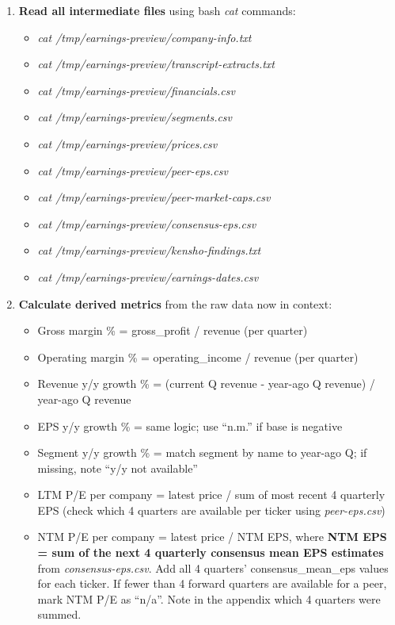 \documentclass[11pt]{article}
\begin{document}
\begin{enumerate}[leftmargin=*,itemsep=2pt,topsep=2pt]
\item {} \textbf{Read all intermediate files} using bash \emph{cat} commands:
\begin{itemize}[leftmargin=*,itemsep=2pt,topsep=2pt]
\item {} \emph{cat /tmp/earnings-preview/company-info.txt}
\item {} \emph{cat /tmp/earnings-preview/transcript-extracts.txt}
\item {} \emph{cat /tmp/earnings-preview/financials.csv}
\item {} \emph{cat /tmp/earnings-preview/segments.csv}
\item {} \emph{cat /tmp/earnings-preview/prices.csv}
\item {} \emph{cat /tmp/earnings-preview/peer-eps.csv}
\item {} \emph{cat /tmp/earnings-preview/peer-market-caps.csv}
\item {} \emph{cat /tmp/earnings-preview/consensus-eps.csv}
\item {} \emph{cat /tmp/earnings-preview/kensho-findings.txt}
\item {} \emph{cat /tmp/earnings-preview/earnings-dates.csv}
\end{itemize}
\item {} \textbf{Calculate derived metrics} from the raw data now in context:
\begin{itemize}[leftmargin=*,itemsep=2pt,topsep=2pt]
\item {} Gross margin \% = gross\_\allowbreak{}profit / revenue (per quarter)
\item {} Operating margin \% = operating\_\allowbreak{}income / revenue (per quarter)
\item {} Revenue y/y growth \% = (current Q revenue - year-ago Q revenue) / year-ago Q revenue
\item {} EPS y/y growth \% = same logic; use ``n.m.'' if base is negative
\item {} Segment y/y growth \% = match segment by name to year-ago Q; if missing, note ``y/y not available''
\item {} LTM P/E per company = latest price / sum of most recent 4 quarterly EPS (check which 4 quarters are available per ticker using \emph{peer-eps.csv})
\item {} NTM P/E per company = latest price / NTM EPS, where \textbf{NTM EPS = sum of the next 4 quarterly consensus mean EPS estimates} from \emph{consensus-eps.csv}. Add all 4 quarters' consensus\_\allowbreak{}mean\_\allowbreak{}eps values for each ticker. If fewer than 4 forward quarters are available for a peer, mark NTM P/E as ``n/a''. Note in the appendix which 4 quarters were summed.

\end{itemize}
\end{enumerate}
\end{document}
